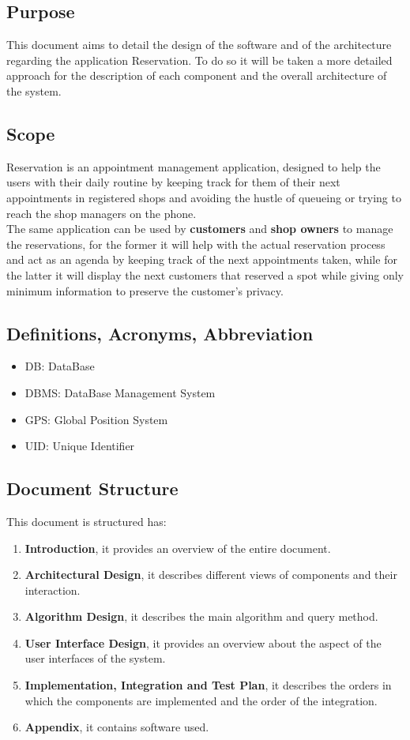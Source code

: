 \subsection{Purpose}
This document aims to detail the design of the software and of the architecture regarding the application Reservation.
To do so it will be taken a more detailed approach for the description of each component and the overall architecture of the system.

\subsection{Scope}
Reservation is an appointment management application, designed to help the users with their daily routine by keeping track for them of their next appointments in registered shops and avoiding the hustle of queueing or trying to reach the shop managers on the phone.\\
The same application can be used by \textbf{customers} and \textbf{shop owners} to manage the reservations, for the former it will help with the actual reservation process and act as an agenda by keeping track of the next appointments taken, while for the latter it will display the next customers that reserved a spot while giving only minimum information to preserve the customer's privacy.

\subsection{Definitions, Acronyms, Abbreviation}
\begin{itemize}
\item DB: DataBase
\item DBMS: DataBase Management System
\item GPS: Global Position System
\item UID: Unique Identifier
\end{itemize}

\subsection{Document Structure}
This document is structured has:
\begin{enumerate}
	\item \textbf{Introduction}, it provides an overview of the entire document.
	\item \textbf{Architectural Design}, it describes different views of components and their interaction.
		\item \textbf{Algorithm Design}, it describes the main algorithm and query method.
	\item \textbf{User Interface Design}, it provides an overview about the aspect of the user interfaces of the system.
	\item \textbf{Implementation, Integration and Test Plan}, it describes the orders in which the components are implemented and the order of the integration.
	\item \textbf{Appendix}, it contains software used.
\end{enumerate}



